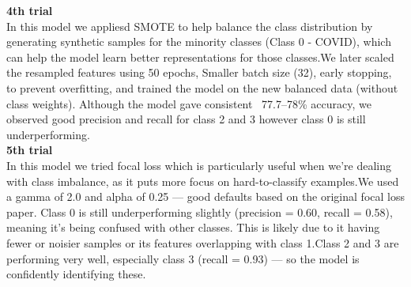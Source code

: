 \documentclass{article}
\begin{document}
\textbf{4th trial}\\
In this model we appliesd SMOTE to help balance the class distribution by generating synthetic samples for the minority classes (Class 0 - COVID), which can help the model learn better representations for those classes.We later scaled the resampled features using 50 epochs, Smaller batch size (32), early stopping, to prevent overfitting, and trained the model on the new balanced data (without class weights). Although the model gave consistent ~77.7–78\% accuracy, we observed good precision and recall for class 2 and 3 however class 0 is still underperforming.\\

\textbf{5th trial}\\
In this model we tried focal loss which is particularly useful when we're dealing with class imbalance, as it puts more focus on hard-to-classify examples.We used a gamma of 2.0 and alpha of 0.25 — good defaults based on the original focal loss paper. Class 0 is still underperforming slightly (precision = 0.60, recall = 0.58), meaning it's being confused with other classes. This is likely due to it having fewer or noisier samples or its features overlapping with class 1.Class 2 and 3 are performing very well, especially class 3 (recall = 0.93) — so the model is confidently identifying these.\\
\end{document}
